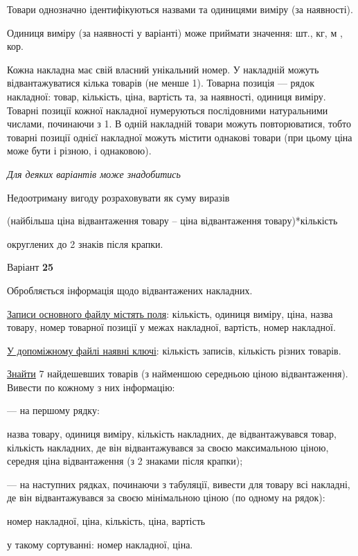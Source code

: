 \documentclass[11pt, ukrainian]{article}
\begin{document}
Товари однозначно ідентифікуються назвами та одиницями виміру (за наявності).

Одиниця виміру (за наявності у варіанті) може приймати значення: шт., кг, м , кор.

Кожна накладна має свій власний унікальний номер.
У накладній можуть відвантажуватися кілька товарів (не менше 1).
Товарна позиція --- рядок накладної: товар, кількість, ціна, вартість та, за наявності, одиниця виміру.
Товарні позиції кожної накладної нумеруються послідовними натуральними числами, починаючи з 1.
В одній накладній товари можуть повторюватися, 
тобто товарні позиції однієї накладної можуть містити однакові товари 
(при цьому ціна може бути і різною, і однаковою).

\bigskip\textit{Для деяких варіантів може знадобитись}

Недоотриману вигоду розраховувати як суму виразів
{\center (найбільша ціна відвантаження товару – ціна відвантаження товару)*кількість\par}

\bigskip
{\noindent} округлених до 2 знаків після крапки.


\par
\newpage
{\center Варіант  \No \textbf { 25 }\par}
\bigskip
Обробляється інформація щодо відвантажених накладних.

\underline{Записи основного файлу містять поля}: кількість, одиниця виміру, ціна, назва товару, номер товарної позиції у межах накладної, вартість, номер накладної.

\underline{У допоміжному файлі наявні ключі}: кількість записів, кількість різних товарів.

\underline{Знайти} 7 найдешевших товарів (з найменшою середньою ціною відвантаження). Вивести по кожному з них інформацію:\par
{\noindent}--- на першому рядку:\par
назва товару, одиниця виміру, кількість накладних, де відвантажувався товар, кількість накладних, де він відвантажувався за своєю максимальною ціною, середня ціна відвантаження (з 2 знаками після крапки);

{\noindent}--- на наступних рядках, починаючи з табуляції, вивести для товару всі накладні, де він відвантажувався за своєю мінімальною ціною (по одному на рядок):\par
номер накладної, ціна, кількість, ціна, вартість

{\noindent}у такому сортуванні: номер накладної, ціна.
\end{document}
